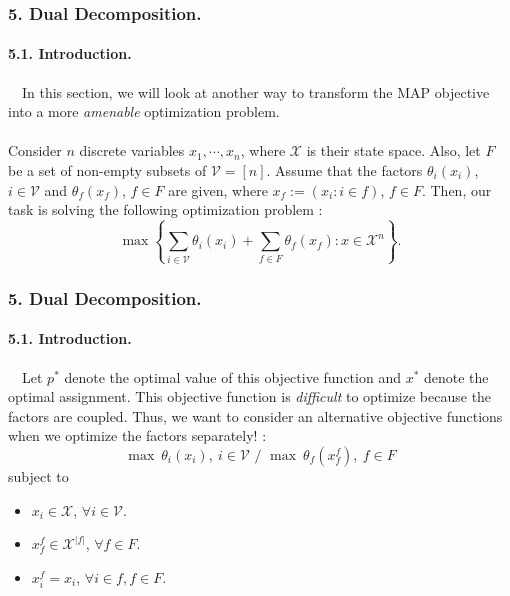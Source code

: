 \documentclass[11pt]{beamer}
\newtheorem*{pf of lemma}{\it Proof of the \normalfont \bf Lemma}
\newtheorem*{pf of claim}{\it Proof of the \normalfont \sf Claim}
\begin{document}
\begin{frame}
\frametitle{5. Dual Decomposition.}
\framesubtitle{5.1. Introduction.}

\ \ \indent In this section, we will look at another way to transform the MAP objective into a more \textit{amenable} optimization problem. \\ \ \\
Consider $n$ discrete variables $x_1, \cdots, x_n$, where $\mathcal{X}$ is their state space. Also, let $F$ be a set of non-empty subsets of $\mathcal{V} = [n]$. Assume that the factors $\theta_{i} \left(x_i \right)$, $i \in \mathcal{V}$ and $\theta_{f}\left( x_f \right)$, $f \in F$ are given, where $x_f := \left(x_i : i \in f \right)$, $f \in F$. Then, our task is solving the following optimization problem :
$$\max \left\{ \sum_{i \in \mathcal{V}} \theta_i \left(x_i \right) + \sum_{f \in F} \theta_f \left(x_f \right) : x \in \mathcal{X}^n \right\}.$$
\end{frame}

\begin{frame}
\frametitle{5. Dual Decomposition.}
\framesubtitle{5.1. Introduction.}
\ \ \indent Let $p^*$ denote the optimal value of this objective function and $x^*$ denote the optimal assignment. This objective function is \textit{difficult} to optimize because the factors are coupled. Thus, we want to consider an alternative objective functions when we optimize the factors separately! :
$$\max \ \theta_i (x_i),\ i \in \mathcal{V} \mbox{ / } \max \ \theta_f \left( x_{f}^f \right),\ f \in F$$
subject to
\begin{itemize}
\item $x_i \in \mathcal{X}$, $\forall i \in \mathcal{V}$. \\
\item $x_{f}^f \in \mathcal{X}^{|f|}$, $\forall f \in F$. \\
\item $x_{i}^f = x_i$, $\forall i \in f, f \in F$.
\end{itemize}
\end{frame}
\end{document}
